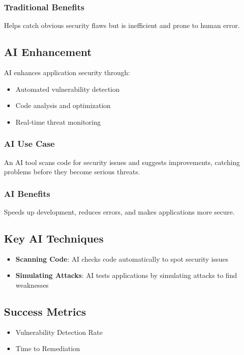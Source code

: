 \documentclass[10pt,a4paper]{article}
\begin{document}
\subsubsection{Traditional Benefits}
Helps catch obvious security flaws but is inefficient and prone to human error.

\subsection{AI Enhancement}
AI enhances application security through:
\begin{itemize}\itemsep0.5em
    \item Automated vulnerability detection
    \item Code analysis and optimization
    \item Real-time threat monitoring
\end{itemize}

\subsubsection{AI Use Case}
An AI tool scans code for security issues and suggests improvements, catching problems before they become serious threats.

\subsubsection{AI Benefits}
Speeds up development, reduces errors, and makes applications more secure.

\subsection{Key AI Techniques}
\begin{itemize}\itemsep0.5em
    \item \textbf{Scanning Code}: AI checks code automatically to spot security issues
    \item \textbf{Simulating Attacks}: AI tests applications by simulating attacks to find weaknesses
\end{itemize}

\subsection{Success Metrics}
\begin{itemize}\itemsep0.5em
    \item Vulnerability Detection Rate
    \item Time to Remediation
\end{itemize}
\end{document}
